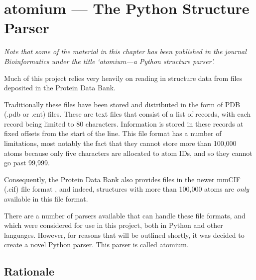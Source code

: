 


\chapter{atomium --- The Python Structure Parser} %
\label{Chapter3}


\emph{Note that some of the material in this chapter has been published in the journal Bioinformatics under the title `atomium—a Python structure parser'.} \cite{ireland2020}

Much of this project relies very heavily on reading in structure data from files deposited in the Protein Data Bank.

Traditionally these files have been stored and distributed in the form of PDB (.pdb or .ent) files. These are text files that consist of a list of records, with each record being limited to 80 characters. Information is stored in these records at fixed offsets from the start of the line. This file format has a number of limitations, most notably the fact that they cannot store more than 100,000 atoms because only five characters are allocated to atom IDs, and so they cannot go past 99,999.

Consequently, the Protein Data Bank also provides files in the newer mmCIF (.cif) file format \cite{hall1991mmcif}, and indeed, structures with more than 100,000 atoms are \emph{only} available in this file format.

There are a number of parsers available that can handle these file formats, and which were considered for use in this project, both in Python and other languages. However, for reasons that will be outlined shortly, it was decided to create a novel Python parser. This parser is called atomium.

\section{Rationale}


